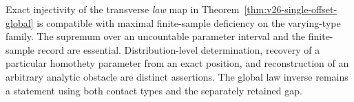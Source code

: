 Exact injectivity of the transverse \emph{law} map in
Theorem~\ref{thm:v26-single-offset-global} is compatible with maximal
finite-sample deficiency on the varying-type family.  The supremum over
an uncountable parameter interval and the finite-sample record are essential.
Distribution-level determination, recovery of a particular homothety
parameter from an exact position, and reconstruction of an arbitrary
analytic obstacle are distinct assertions.  The global law inverse remains
a statement using both contact types and the separately retained gap.
